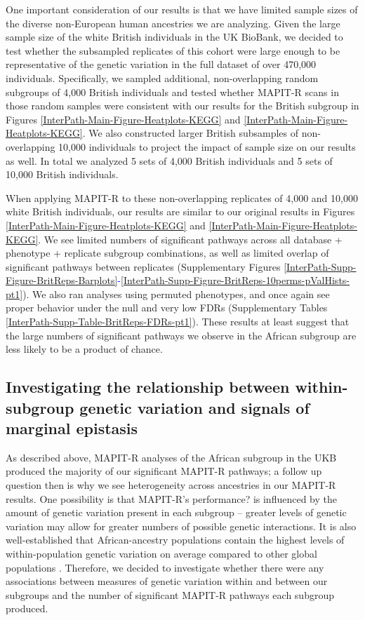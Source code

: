 \documentclass[12pt,a4paper]{article}
\begin{document}
One important consideration of our results is that we have limited sample sizes of the diverse non-European human ancestries we are analyzing. Given the large sample size of the white British individuals in the UK BioBank, we decided to test whether the subsampled replicates of this cohort were large enough to be representative of the genetic variation in the full dataset of over 470,000 individuals. Specifically, we sampled additional, non-overlapping random subgroups of 4,000 British individuals and tested whether MAPIT-R scans in those random samples were consistent with our results for the British subgroup in Figures \ref{InterPath-Main-Figure-Heatplots-KEGG} and \ref{InterPath-Main-Figure-Heatplots-KEGG}.  We also constructed larger British subsamples of non-overlapping 10,000 individuals to project the impact of sample size on our results as well. In total we analyzed 5 sets of 4,000 British individuals and 5 sets of 10,000 British individuals. 

When applying MAPIT-R to these non-overlapping replicates of 4,000 and 10,000 white British individuals, our results are similar to our original results in Figures \ref{InterPath-Main-Figure-Heatplots-KEGG} and \ref{InterPath-Main-Figure-Heatplots-KEGG}. We see limited numbers of significant pathways across all database + phenotype + replicate subgroup combinations, as well as limited overlap of significant pathways between replicates (Supplementary Figures \ref{InterPath-Supp-Figure-BritReps-Barplots}\textcolor{blue}{-}\ref{InterPath-Supp-Figure-BritReps-10perms-pValHists-pt1}). We also ran analyses using permuted phenotypes, and once again see proper behavior under the null and very low FDRs (Supplementary Tables \ref{InterPath-Supp-Table-BritReps-FDRs-pt1}). These results at least suggest that the large numbers of significant pathways we observe in the African subgroup are less likely to be a product of chance.  

\subsection{Investigating the relationship between within-subgroup genetic variation and signals of marginal epistasis}

As described above, MAPIT-R analyses of the African subgroup in the UKB produced the majority of our significant MAPIT-R pathways; a follow up question then is why we see heterogeneity across ancestries in our MAPIT-R results. One possibility is that MAPIT-R's performance? is influenced by the amount of genetic variation present in each subgroup -- greater levels of genetic variation may allow for greater numbers of possible genetic interactions. It is also well-established that African-ancestry populations contain the highest levels of within-population genetic variation on average compared to other global populations \citep{International2010,Genomes2015,Mallick2016}. Therefore, we decided to investigate whether there were any associations between measures of genetic variation within and between our subgroups and the number of significant MAPIT-R pathways each subgroup produced.
\end{document}
